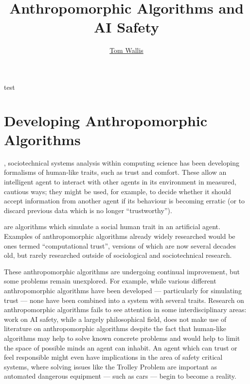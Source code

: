 
\title{Anthropomorphic Algorithms and AI Safety}
\author[Tom Wallis]{\href{http://tom.coffee/}{Tom Wallis}}
\date{}



\maketitle
test
\section{Developing Anthropomorphic Algorithms}

, sociotechnical systems analysis within computing science has been developing formalisms of human-like traits, such as trust and comfort. These allow an intelligent agent to interact with other agents in its environment in measured, cautious ways; they might be used, for example, to decide whether it should accept information from another agent if its behaviour is becoming erratic (or to discard previous data which is no longer ``trustworthy'').\par

 are algorithms which simulate a social human trait in an artificial agent. Examples of anthropomorphic algorithms already widely researched would be ones termed ``computational trust'', versions of which are now several decades old\cite{marsh1994}, but rarely researched outside of sociological and sociotechnical research.\par
These anthropomorphic algorithms are undergoing continual improvement\cite{kramdi, Urbano2014}, but some problems remain unexplored. For example, while various different anthropomorphic algorithms have been developed --- particularly for simulating trust --- none have been combined into a system with several traits. Research on anthropomorphic algorithms fails to see attention in some interdisciplinary areas: work on AI safety, while a largely philosophical field, does not make use of literature on anthropomorphic algorithms despite the fact that human-like algorithms may help to solve known concrete problems\cite{concrete_problems} and would help to limit the space of possible minds an agent can inhabit.\cite{sloman_spaceofminds} An agent which can trust or feel responsible might even have implications in the area of safety critical systems, where solving issues like the Trolley Problem are important as automated dangerous equipment --- such as cars --- begin to become a reality.\par

